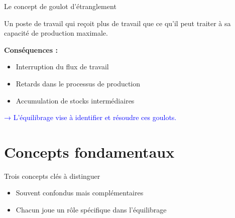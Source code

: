 \documentclass{beamer}
\begin{document}
\begin{frame}{Le concept de goulot d'étranglement}
    \begin{definition}
        Un poste de travail qui reçoit plus de travail que ce qu'il peut traiter à sa capacité de production maximale.
    \end{definition}
    
    \vspace{0.5cm}
    
    \textbf{Conséquences :}
    \begin{itemize}
        \item Interruption du flux de travail
        \item Retards dans le processus de production
        \item Accumulation de stocks intermédiaires
    \end{itemize}
    
    \vspace{0.3cm}
    \textcolor{blue}{→ L'équilibrage vise à identifier et résoudre ces goulots.}
\end{frame}

\section{Concepts fondamentaux}

\begin{frame}{Trois concepts clés à distinguer}
    \begin{center}
    \end{center}
    
    \vspace{0.5cm}
    \begin{itemize}
        \item Souvent confondus mais complémentaires
        \item Chacun joue un rôle spécifique dans l'équilibrage
    \end{itemize}
\end{frame}
\end{document}
